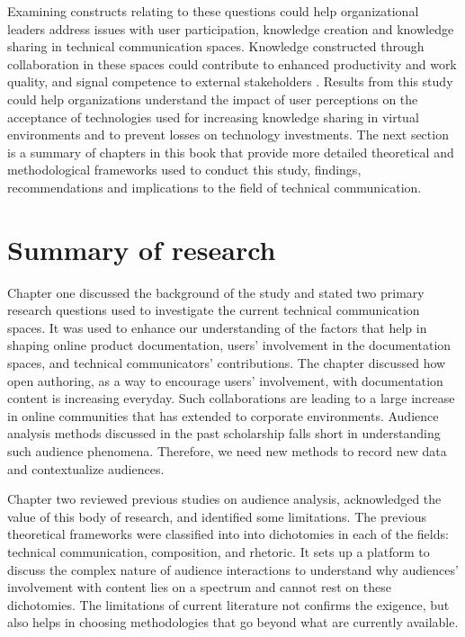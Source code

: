 Examining constructs relating to these questions could help organizational leaders address issues with user participation, knowledge creation and knowledge sharing in technical communication spaces. Knowledge constructed through collaboration in these spaces could contribute to enhanced productivity and work quality, and signal competence to external stakeholders \cite{haas2007different}. Results from this study could help organizations understand the impact of user perceptions on the acceptance of technologies used for increasing knowledge sharing in virtual environments and to prevent losses on technology investments. The next section is a summary of chapters in this book that provide more detailed theoretical and methodological frameworks used to conduct this study, findings, recommendations and implications to the field of technical communication.

\section{Summary of research}
Chapter one discussed the background of the study and stated two primary research questions used to investigate the current technical communication spaces. It was used to enhance our understanding of the factors that help in shaping online product documentation, users' involvement in the documentation spaces, and technical communicators' contributions. The chapter discussed how open authoring, as a way to encourage users' involvement, with documentation content is increasing everyday. Such collaborations are leading to a large increase in online communities that has extended to corporate environments. Audience analysis methods discussed in the past scholarship falls short in understanding such audience phenomena. Therefore, we need new methods to record new data and contextualize audiences. 

Chapter two reviewed previous studies on audience analysis, acknowledged the value of this body of research, and identified some limitations. The previous theoretical frameworks were classified into into dichotomies in each of the fields: technical communication, composition, and rhetoric. It sets up a platform to discuss the complex nature of audience interactions to understand why audiences' involvement with content lies on a spectrum and cannot rest on these dichotomies. The limitations of current literature not confirms the exigence, but also helps in choosing methodologies that go beyond what are currently available. 

